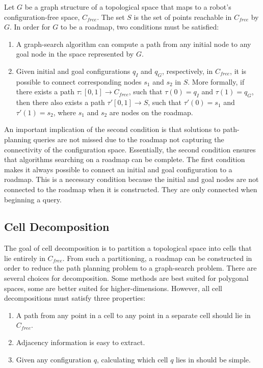 \documentclass[10pt,conference]{ieeeconf}
\begin{document}
	Let $G$ be a graph structure of a topological space that maps to a robot's configuration-free space, $C_{free}$. The set $S$ is the set of points reachable in $C_{free}$ by $G$. In order for $G$ to be a roadmap, two conditions must be satisfied:
	\begin{enumerate}
	\item 
	A graph-search algorithm can compute a path from any initial node to any goal node in the space represented by $G$.
	
	\item
	Given initial and goal configurations $q_I$ and $q_G$, respectively, in $C_{free}$, it is possible to connect corresponding nodes $s_1$ and $s_2$ in $S$. More formally, if there exists a path $\tau :[0,1] \rightarrow C_{free}$, such that $\tau (0)=q_I$ and $\tau (1)=q_G$, then there also exists a path $\tau'[0,1] \rightarrow S$, such that $\tau'(0)=s_1$ and $\tau'(1)=s_2$, where $s_1$ and $s_2$ are nodes on the roadmap.
	\end{enumerate}
	
	An important implication of the second condition is that solutions to path-planning queries are not missed due to the roadmap not capturing the connectivity of the configuration space. Essentially, the second condition ensures that algorithms searching on a roadmap can be complete. The first condition makes it always possible to connect an initial and goal configuration to a roadmap. This is a necessary condition because the initial and goal nodes are not connected to the roadmap when it is constructed. They are only connected when beginning a query.
	
\subsection{Cell Decomposition}

The goal of cell decomposition is to partition a topological space into cells that lie entirely in $C_{free}$. From such a partitioning, a roadmap can be constructed in order to reduce the path planning problem to a graph-search problem. There are several choices for decomposition. Some methods are best suited for polygonal spaces, some are better suited for higher-dimensions. However, all cell decompositions must satisfy three properties:

\begin{enumerate}
\item A path from any point in a cell to any point in a separate cell should lie in $C_{free}$.

\item Adjacency information is easy to extract.

\item Given any configuration $q$, calculating which cell $q$ lies in should be simple.
\end{enumerate}
\end{document}
